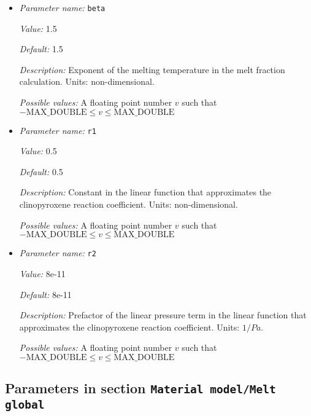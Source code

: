 \begin{itemize}
{\it Description:} The value of the constant viscosity. Units: $kg/m/s$.


{\it Possible values:} A floating point number $v$ such that $0 \leq v \leq \text{MAX\_DOUBLE}$
\item {\it Parameter name:} {\tt beta}
\label{parameters:Material model/Latent heat melt/beta}
\label{parameters:Material_20model/Latent_20heat_20melt/beta}


{\it Value:} 1.5


{\it Default:} 1.5


{\it Description:} Exponent of the melting temperature in the melt fraction calculation. Units: non-dimensional.


{\it Possible values:} A floating point number $v$ such that $-\text{MAX\_DOUBLE} \leq v \leq \text{MAX\_DOUBLE}$
\item {\it Parameter name:} {\tt r1}
\label{parameters:Material model/Latent heat melt/r1}
\label{parameters:Material_20model/Latent_20heat_20melt/r1}


{\it Value:} 0.5


{\it Default:} 0.5


{\it Description:} Constant in the linear function that approximates the clinopyroxene reaction coefficient. Units: non-dimensional.


{\it Possible values:} A floating point number $v$ such that $-\text{MAX\_DOUBLE} \leq v \leq \text{MAX\_DOUBLE}$
\item {\it Parameter name:} {\tt r2}
\label{parameters:Material model/Latent heat melt/r2}
\label{parameters:Material_20model/Latent_20heat_20melt/r2}


{\it Value:} 8e-11


{\it Default:} 8e-11


{\it Description:} Prefactor of the linear pressure term in the linear function that approximates the clinopyroxene reaction coefficient. Units: $1/Pa$.


{\it Possible values:} A floating point number $v$ such that $-\text{MAX\_DOUBLE} \leq v \leq \text{MAX\_DOUBLE}$
\end{itemize}

\subsection{Parameters in section \tt Material model/Melt global}
\label{parameters:Material_20model/Melt_20global}

